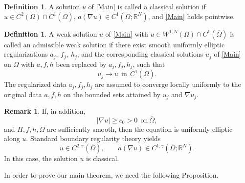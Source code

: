 \documentclass[reqno, 11pt]{amsart} %
\numberwithin{equation}{section}
\theoremstyle{definition}
\newtheorem{rmk}[thm]{Remark}
\newtheorem{defn}[thm]{Definition}
\newcommand{\R}{\mathbb{R}}
\begin{document}
\begin{defn}\label{def:classicalRA}
A solution $u$ of \eqref{Main} is called a classical solution if $u\in C^2(\Omega)\cap C^1(\overline\Omega)$, $a(\nabla u)\in C^1(\overline\Omega;\R^N)$, and \eqref{Main} holds pointwise.
\end{defn}

\begin{defn}\label{def:weakRA}
A weak solution $u$ of \eqref{Main} with $u \in W^{1,N}(\Omega)\cap C^1(\overline\Omega) $ is called an admissible weak solution if there exist smooth uniformly elliptic regularizations $a_j,\ f_j,\ h_j$, and the corresponding classical solutions $u_j$ of \eqref{Main} on $\Omega$ with $a,f,h$ been replaced by $a_j,f_j,h_j$,  such that
\[
    u_j\longrightarrow u \ \ \text{in} \ \ C^1(\overline\Omega).
\]
The regularized data $a_j, f_j, h_j$ are assumed to converge locally uniformly to the original data $a,f,h$ on the bounded sets attained by $u_j$ and $\nabla u_j$.
\end{defn}



\begin{rmk}
If, in addition,
\[
    |\nabla u|\ge c_0>0 \ \ \text{on}\ \overline\Omega,
\]
and $H,f,h,\Omega$ are sufficiently smooth, then the
equation is uniformly elliptic along $u$. Standard boundary
regularity theory yields
\[
    u\in C^{2,\gamma}(\overline\Omega), \qquad a(\nabla u) \in C^{1,\gamma}(\overline\Omega;\mathbb R^N).
\]
In this case, the solution $u$ is classical.
\end{rmk}


In order to prove our main theorem, we need the following Proposition.
\end{document}
